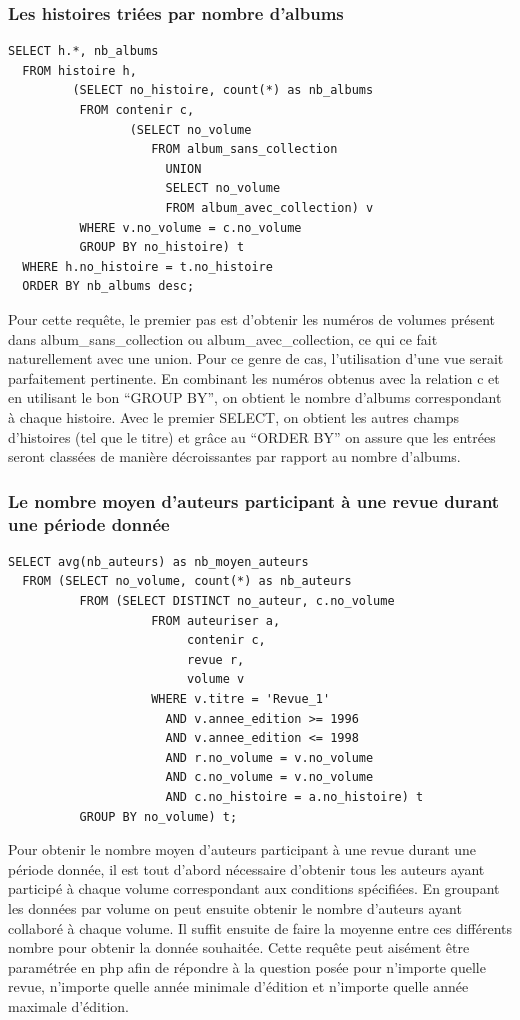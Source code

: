 \documentclass[12pt]{article}
\begin{document}
\subsubsection*{Les histoires triées par nombre d'albums}
\begin{lstlisting}
SELECT h.*, nb_albums
  FROM histoire h,
  		 (SELECT no_histoire, count(*) as nb_albums
          FROM contenir c,
          		 (SELECT no_volume
          		    FROM album_sans_collection
          			  UNION
          			  SELECT no_volume
          			  FROM album_avec_collection) v
          WHERE v.no_volume = c.no_volume
          GROUP BY no_histoire) t
  WHERE h.no_histoire = t.no_histoire
  ORDER BY nb_albums desc;
\end{lstlisting}
Pour cette requête, le premier pas est d'obtenir les numéros de volumes
présent dans album\_sans\_collection ou album\_avec\_collection, ce qui ce
fait naturellement avec une union. Pour ce genre de cas, l'utilisation d'une
vue serait parfaitement pertinente. En combinant les numéros obtenus avec
la relation c et en utilisant le bon ``GROUP BY'', on obtient le nombre
d'albums correspondant à chaque histoire. Avec le premier SELECT, on obtient
les autres champs d'histoires (tel que le titre) et grâce au ``ORDER BY'' on
assure que les entrées seront classées de manière décroissantes par rapport
au nombre d'albums.

\subsubsection*{Le nombre moyen d'auteurs participant à une revue durant
une période donnée}
\begin{lstlisting}
SELECT avg(nb_auteurs) as nb_moyen_auteurs
  FROM (SELECT no_volume, count(*) as nb_auteurs
          FROM (SELECT DISTINCT no_auteur, c.no_volume
                    FROM auteuriser a,
                         contenir c,
                         revue r,
                         volume v
                    WHERE v.titre = 'Revue_1'
                      AND v.annee_edition >= 1996
                      AND v.annee_edition <= 1998
                      AND r.no_volume = v.no_volume
                      AND c.no_volume = v.no_volume
                      AND c.no_histoire = a.no_histoire) t
          GROUP BY no_volume) t;
\end{lstlisting}
Pour obtenir le nombre moyen d'auteurs participant à une revue durant une
période donnée, il est tout d'abord nécessaire d'obtenir tous les auteurs
ayant participé à chaque volume correspondant aux conditions spécifiées. En
groupant les données par volume on peut ensuite obtenir le nombre d'auteurs
ayant collaboré à chaque volume. Il suffit ensuite de faire la moyenne entre
ces différents nombre pour obtenir la donnée souhaitée. Cette requête peut
aisément être paramétrée en php afin de répondre à la question posée pour
n'importe quelle revue, n'importe quelle année minimale d'édition et
n'importe quelle année maximale d'édition.
\end{document}
